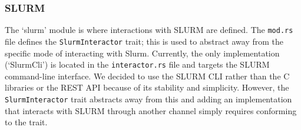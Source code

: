 \subsubsection{SLURM}

The `slurm' module is where interactions with SLURM are defined.
The \verb|mod.rs| file defines the \verb|SlurmInteractor| trait;
this is used to abstract away from the specific mode of interacting
with Slurm.
Currently, the only implementation (`SlurmCli') is located in the
\verb|interactor.rs| file and targets the SLURM command-line interface.
We decided to use the SLURM CLI rather than the C libraries or
the REST API because of its stability and simplicity.
However, the \verb|SlurmInteractor| trait abstracts away from this and
adding an implementation that interacts with SLURM through another
channel simply requires conforming to the trait.
